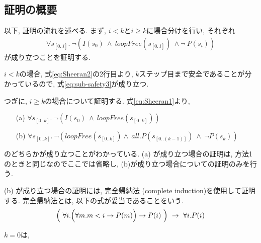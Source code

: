 \documentclass{jsarticle}
\begin{document}
\subsection{証明の概要}

以下, 証明の流れを述べる.
まず, $i < k$と$i \geq k$に場合分けを行い, それぞれ 
\begin{align}
 \label{eq:sub-safety3}
  \forall s_{[0..i]}. \ \neg (I(s_0) \ \wedge \ \mathit{loopFree}(s_{[0..i]}) \ \wedge \neg \ P(s_i)) 
\end{align}
が成り立つことを証明する.

$i < k$の場合, 式\eqref{eq:Sheeran2}の2行目より, 
$k$ステップ目まで安全であることが分かっているので, 式\eqref{eq:sub-safety3}が成り立つ. 

つぎに, $i \geq k$の場合について証明する.
式\eqref{eq:Sheeran1}より, 
\begin{itemize}
 \item[(a)] $\forall s_{[0..k]}. \ \neg(I(s_0) \ \wedge \ \mathit{loopFree}(s_{[0..k]}))$ 
 \item[(b)] $\forall s_{[0..k]}. \ \neg (\mathit{loopFree}(s_{[0..k]}) \land \ \mathit{all.} P(s_{[0..(k-1)]}) \ \wedge \ \neg P(s_k))$
\end{itemize}
のどちらかが成り立つことがわかっている.
(a) が成り立つ場合の証明は, 方法1のときと同じなのでここでは省略し,  (b)が成り立つ場合についての証明のみを行う.

(b) が成り立つ場合の証明には, 完全帰納法 (complete induction)を使用して証明する.
完全帰納法とは, 以下の式が妥当であることをいう.
\begin{align}
 \label{eq:comp-ind}
 \Bigl (~ \forall i. \Bigl ( \forall m. m < i \to P(m) \Bigr) \to P(i) ~\Bigr)\ \to \ \forall i. P(i)
 \end{align}
 
$k = 0$は, 
\end{document}
